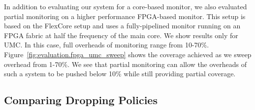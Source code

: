 In addition to evaluating our system for a core-based monitor, we also
evaluated partial monitoring on a higher performance FPGA-based monitor. This
setup is based on the FlexCore \cite{flexcore-micro10} setup and uses a
fully-pipelined monitor running on an FPGA fabric at half the frequency of the
main core. We show results only for UMC. In this case, full overheads of
monitoring range from 10-70\%. Figure~\ref{fig:evaluation.fpga_umc_sweep} shows
the coverage achieved as we sweep overhead from 1-70\%. We see that partial
monitoring can allow the overheads of such a system to be pushed below 10\%
while still providing partial coverage.

\subsection{Comparing Dropping Policies}

% 

